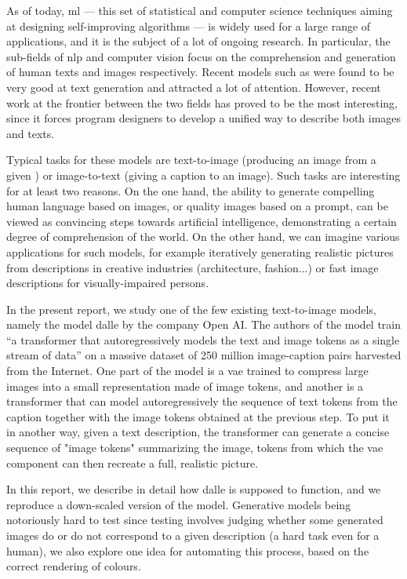 \documentclass{article}
\begin{document}
\begin{multicols}{2}

As of today, \gls{ml} — this set of statistical and computer science techniques aiming at designing self-improving algorithms — is widely used for a large range of applications, and it is the subject of a lot of ongoing research. In particular, the sub-fields of \gls{nlp} and computer vision focus on the comprehension and generation of human texts and images respectively. Recent models such as  were found to be very good at text generation and attracted a lot of attention. However, recent work at the frontier between the two fields has proved to be the most interesting, since it forces program designers to develop a unified way to describe both images and texts.

Typical tasks for these models are text-to-image (producing an image from a given ) or image-to-text (giving a caption to an image). Such tasks are interesting for at least two reasons. On the one hand, the ability to generate compelling human language based on images, or quality images based on a prompt, can be viewed as convincing steps towards artificial intelligence, demonstrating a certain degree of comprehension of the world. On the other hand, we can imagine various applications for such models, for example iteratively generating realistic pictures from descriptions in creative industries (architecture, fashion...) or fast image descriptions for visually-impaired persons. 

In the present report, we study one of the few existing text-to-image models, namely the model \gls{dalle} by the company Open AI. The authors of the model train \enquote{a transformer that autoregressively models the text and image tokens as a single stream of data} on a massive dataset of 250 million image-caption pairs harvested from the Internet. One part of the model is a \gls{vae} trained to compress large images into a small representation made of image \glspl{token}, and another is a \gls{transformer} that can model autoregressively the sequence of text tokens from the caption together with the image tokens obtained at the previous step. To put it in another way, given a text description, the transformer can generate a concise sequence of "image tokens" summarizing the image, tokens from which the \gls{vae} component can then recreate a full, realistic picture.

In this report, we describe in detail how \gls{dalle} is supposed to function, and we reproduce a down-scaled version of the model. Generative models being notoriously hard to test since testing involves judging whether some generated images do or do not correspond to a given description (a hard task even for a human), we also explore one idea for automating this process, based on the correct rendering of colours.


\end{multicols}
\end{document}
